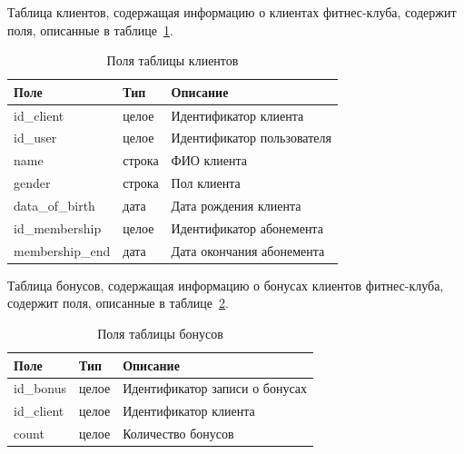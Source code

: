Таблица клиентов, содержащая информацию о клиентах фитнес-клуба, содержит поля, описанные в таблице~\ref{tbl:pol_clients}.
\begin{table}[h!]
	\begin{center}
		\begin{threeparttable}
			\captionsetup{justification=raggedright,singlelinecheck=off}
			\caption{\label{tbl:pol_clients} Поля таблицы клиентов}
			\begin{tabular}{|p{4cm}|p{4cm}|p{6cm}|}
				\hline
				Поле & Тип & Описание \\
				\hline
				id\_client & целое & Идентификатор клиента \\
				\hline
				id\_user & целое & Идентификатор пользователя \\
				\hline
				name & строка & ФИО клиента \\
				\hline
				gender & строка & Пол клиента \\
				\hline
				data\_of\_birth & дата & Дата рождения клиента \\
				\hline
				id\_membership & целое & Идентификатор абонемента \\
				\hline
				membership\_end & дата & Дата окончания абонемента \\
				\hline
			\end{tabular}
		\end{threeparttable}
	\end{center}
\end{table}

Таблица бонусов, содержащая информацию о бонусах клиентов фитнес-клуба, содержит поля, описанные в таблице~\ref{tbl:pol_bonus}.
\begin{table}[h!]
\begin{center}
	\begin{threeparttable}
		\captionsetup{justification=raggedright,singlelinecheck=off}
		\caption{\label{tbl:pol_bonus} Поля таблицы бонусов}
		\begin{tabular}{|p{4cm}|p{4cm}|p{6cm}|}
			\hline
			Поле & Тип & Описание \\
			\hline
			id\_bonus & целое & Идентификатор записи о бонусах \\
			\hline
			id\_client & целое & Идентификатор клиента \\
			\hline
			count & целое & Количество бонусов \\
			\hline
		\end{tabular}
	\end{threeparttable}
\end{center}
\end{table}


